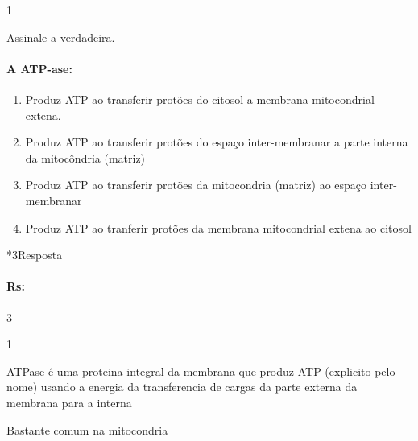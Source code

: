 \documentclass[\mainfilename]{subfiles}
\begin{document}
\begin{questionBox}1{}
    
    Assinale a verdadeira.
    \paragraph{A ATP-ase:}
    \begin{enumerate}
        \item Produz ATP ao transferir protões do citosol a membrana mitocondrial extena.
        \item Produz ATP ao transferir protões do espaço inter-membranar a parte interna da mitocôndria (matriz)
        \item Produz ATP ao transferir protões da mitocondria (matriz) ao espaço inter-membranar
        \item Produz ATP ao tranferir protões da membrana mitocondrial extena ao citosol
    \end{enumerate}

    \begin{questionBox}*3{Resposta}
        
        \paragraph{Rs:} 3
        
    \end{questionBox}
    
\end{questionBox}

\begin{sectionBox}1{}
    
    ATPase é uma proteina integral da membrana que produz ATP (explicito pelo nome) usando a energia da transferencia de cargas da parte externa da membrana para a interna
    
    Bastante comum na mitocondria
    
\end{sectionBox}
\end{document}
